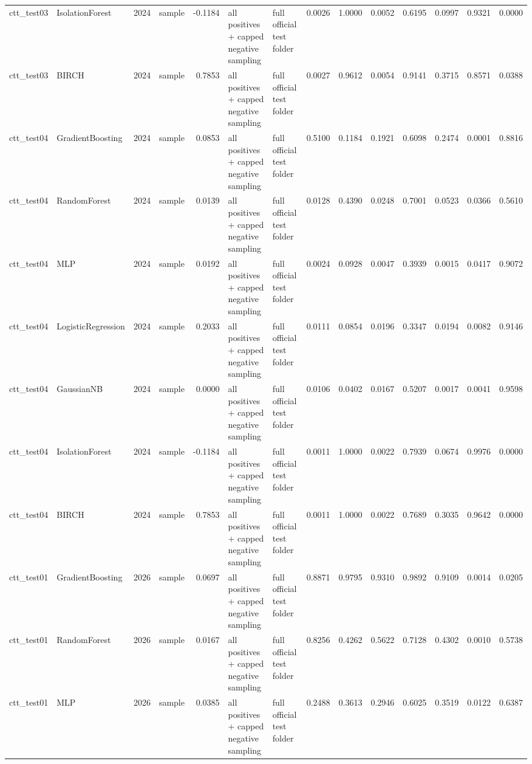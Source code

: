 \begin{tabular}{llrlrllrrrrrrr}
ctt\_test03 & IsolationForest & 2024 & sample & -0.1184 & all positives + capped negative sampling & full official test folder & 0.0026 & 1.0000 & 0.0052 & 0.6195 & 0.0997 & 0.9321 & 0.0000 \\
ctt\_test03 & BIRCH & 2024 & sample & 0.7853 & all positives + capped negative sampling & full official test folder & 0.0027 & 0.9612 & 0.0054 & 0.9141 & 0.3715 & 0.8571 & 0.0388 \\
ctt\_test04 & GradientBoosting & 2024 & sample & 0.0853 & all positives + capped negative sampling & full official test folder & 0.5100 & 0.1184 & 0.1921 & 0.6098 & 0.2474 & 0.0001 & 0.8816 \\
ctt\_test04 & RandomForest & 2024 & sample & 0.0139 & all positives + capped negative sampling & full official test folder & 0.0128 & 0.4390 & 0.0248 & 0.7001 & 0.0523 & 0.0366 & 0.5610 \\
ctt\_test04 & MLP & 2024 & sample & 0.0192 & all positives + capped negative sampling & full official test folder & 0.0024 & 0.0928 & 0.0047 & 0.3939 & 0.0015 & 0.0417 & 0.9072 \\
ctt\_test04 & LogisticRegression & 2024 & sample & 0.2033 & all positives + capped negative sampling & full official test folder & 0.0111 & 0.0854 & 0.0196 & 0.3347 & 0.0194 & 0.0082 & 0.9146 \\
ctt\_test04 & GaussianNB & 2024 & sample & 0.0000 & all positives + capped negative sampling & full official test folder & 0.0106 & 0.0402 & 0.0167 & 0.5207 & 0.0017 & 0.0041 & 0.9598 \\
ctt\_test04 & IsolationForest & 2024 & sample & -0.1184 & all positives + capped negative sampling & full official test folder & 0.0011 & 1.0000 & 0.0022 & 0.7939 & 0.0674 & 0.9976 & 0.0000 \\
ctt\_test04 & BIRCH & 2024 & sample & 0.7853 & all positives + capped negative sampling & full official test folder & 0.0011 & 1.0000 & 0.0022 & 0.7689 & 0.3035 & 0.9642 & 0.0000 \\
ctt\_test01 & GradientBoosting & 2026 & sample & 0.0697 & all positives + capped negative sampling & full official test folder & 0.8871 & 0.9795 & 0.9310 & 0.9892 & 0.9109 & 0.0014 & 0.0205 \\
ctt\_test01 & RandomForest & 2026 & sample & 0.0167 & all positives + capped negative sampling & full official test folder & 0.8256 & 0.4262 & 0.5622 & 0.7128 & 0.4302 & 0.0010 & 0.5738 \\
ctt\_test01 & MLP & 2026 & sample & 0.0385 & all positives + capped negative sampling & full official test folder & 0.2488 & 0.3613 & 0.2946 & 0.6025 & 0.3519 & 0.0122 & 0.6387 \\

\end{tabular}
